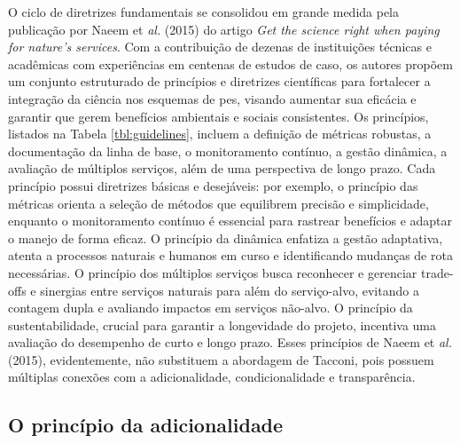 \documentclass[./main.tex]{subfiles}
\begin{document}
\par O ciclo de diretrizes fundamentais se consolidou em grande medida pela publicação por Naeem et \textit{al.} (2015) \cite{Naeem2015b} do artigo \textit{Get the science right when paying for nature’s services}. Com a contribuição de dezenas de instituições técnicas e acadêmicas com experiências em centenas de estudos de caso, os autores propõem um conjunto estruturado de princípios e diretrizes científicas para fortalecer a integração da ciência nos esquemas de \acrshort{pes}, visando aumentar sua eficácia e garantir que gerem benefícios ambientais e sociais consistentes. Os princípios, listados na Tabela \ref{tbl:guidelines}, incluem a definição de métricas robustas, a documentação da linha de base, o monitoramento contínuo, a gestão dinâmica, a avaliação de múltiplos serviços, além de uma perspectiva de longo prazo. Cada princípio possui diretrizes básicas e desejáveis: por exemplo, o princípio das métricas orienta a seleção de métodos que equilibrem precisão e simplicidade, enquanto o monitoramento contínuo é essencial para rastrear benefícios e adaptar o manejo de forma eficaz. O princípio da dinâmica enfatiza a gestão adaptativa, atenta a processos naturais e humanos em curso e identificando mudanças de rota necessárias. O princípio dos múltiplos serviços busca reconhecer e gerenciar trade-offs e sinergias entre serviços naturais para além do serviço-alvo, evitando a contagem dupla e avaliando impactos em serviços não-alvo. O princípio da sustentabilidade, crucial para garantir a longevidade do projeto, incentiva uma avaliação do desempenho de curto e longo prazo. Esses princípios de Naeem et \textit{al.} (2015), evidentemente, não substituem a abordagem de Tacconi, pois possuem múltiplas conexões com a adicionalidade, condicionalidade e transparência. 

\subsection{O princípio da adicionalidade}
\end{document}

